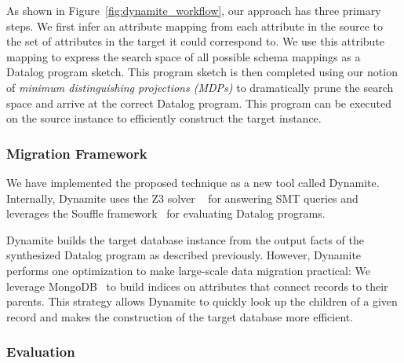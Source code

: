 \documentclass[]{article}
\begin{document}
                As shown in Figure~\ref{fig:dynamite_workflow}, our approach has three primary steps. We first infer an attribute mapping from each attribute in the source to the set of attributes in the target it could correspond to. We use this attribute mapping to express the search space of all possible schema mappings as a Datalog program sketch. This program sketch is then completed using our notion of \textit{minimum distinguishing projections (MDPs)} to dramatically prune the search space and arrive at the correct Datalog program. This program can be executed on the source instance to efficiently construct the target instance. 

            \subsubsection{Migration Framework}


                We have implemented the proposed technique as a new tool called Dynamite. Internally, Dynamite uses the Z3 solver ~\cite{z3-tacas08} for answering SMT queries and leverages the Souffle framework~\cite{souffle-cav16} for evaluating Datalog programs. 

                Dynamite builds the target database instance from the output facts of the synthesized Datalog program as described previously. However, Dynamite performs one optimization to make large-scale data migration practical: We leverage MongoDB~\cite{mongodb-web} to build indices on attributes that connect records to their parents. This strategy allows Dynamite to quickly look up the children of a given record and makes the construction of the target database more efficient. 
            
            \subsubsection{Evaluation}
\end{document}

